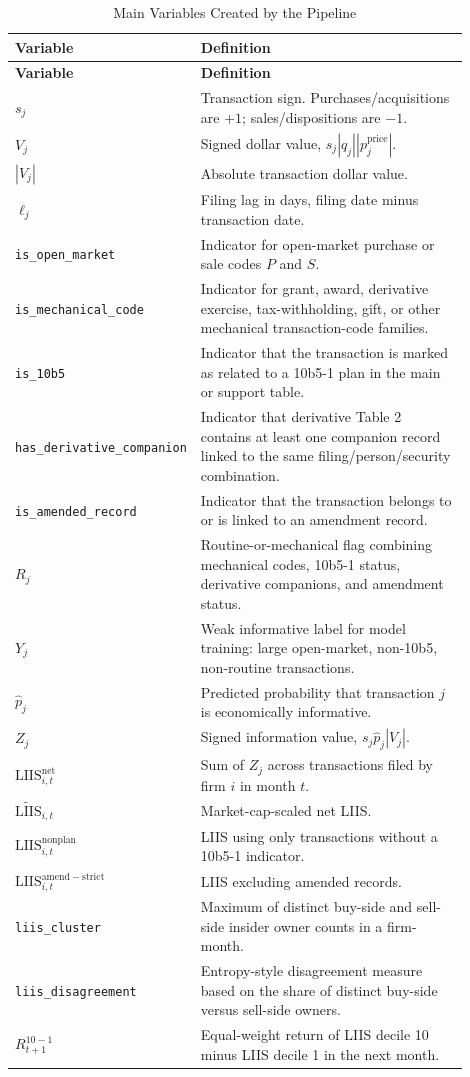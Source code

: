 \documentclass[11pt]{article}
\newcommand{\LIIS}{\mathrm{LIIS}}
\begin{document}
\begin{longtable}{L{0.30\linewidth}L{0.60\linewidth}}
\caption{Main Variables Created by the Pipeline}\label{tab:glossary}\\
\toprule
\textbf{Variable} & \textbf{Definition}\\
\midrule
\endfirsthead
\toprule
\textbf{Variable} & \textbf{Definition}\\
\midrule
\endhead
$s_j$ & Transaction sign. Purchases/acquisitions are $+1$; sales/dispositions
are $-1$.\\
$V_j$ & Signed dollar value, $s_j |q_j||p^{\mathrm{price}}_j|$.\\
$|V_j|$ & Absolute transaction dollar value.\\
$\ell_j$ & Filing lag in days, filing date minus transaction date.\\
\texttt{is\_open\_market} & Indicator for open-market purchase or sale codes
$P$ and $S$.\\
\texttt{is\_mechanical\_code} & Indicator for grant, award, derivative exercise,
tax-withholding, gift, or other mechanical transaction-code families.\\
\texttt{is\_10b5} & Indicator that the transaction is marked as related to a
10b5-1 plan in the main or support table.\\
\texttt{has\_derivative\_\allowbreak companion} & Indicator that derivative
Table 2 contains at least one companion record linked to the same
filing/person/security combination.\\
\texttt{is\_amended\_record} & Indicator that the transaction belongs to or is
linked to an amendment record.\\
$R_j$ & Routine-or-mechanical flag combining mechanical codes, 10b5-1 status,
derivative companions, and amendment status.\\
$Y_j$ & Weak informative label for model training: large open-market,
non-10b5, non-routine transactions.\\
$\widehat{p}_j$ & Predicted probability that transaction $j$ is economically
informative.\\
$Z_j$ & Signed information value, $s_j \widehat{p}_j |V_j|$.\\
$\LIIS^{\mathrm{net}}_{i,t}$ & Sum of $Z_j$ across transactions filed by firm
$i$ in month $t$.\\
$\widetilde{\LIIS}_{i,t}$ & Market-cap-scaled net LIIS.\\
$\LIIS^{\mathrm{nonplan}}_{i,t}$ & LIIS using only transactions without a
10b5-1 indicator.\\
$\LIIS^{\mathrm{amend-strict}}_{i,t}$ & LIIS excluding amended records.\\
\texttt{liis\_cluster} & Maximum of distinct buy-side and sell-side insider
owner counts in a firm-month.\\
\texttt{liis\_disagreement} & Entropy-style disagreement measure based on the
share of distinct buy-side versus sell-side owners.\\
$R^{10-1}_{t+1}$ & Equal-weight return of LIIS decile 10 minus LIIS decile 1 in
the next month.\\
\bottomrule
\end{longtable}
\end{document}
